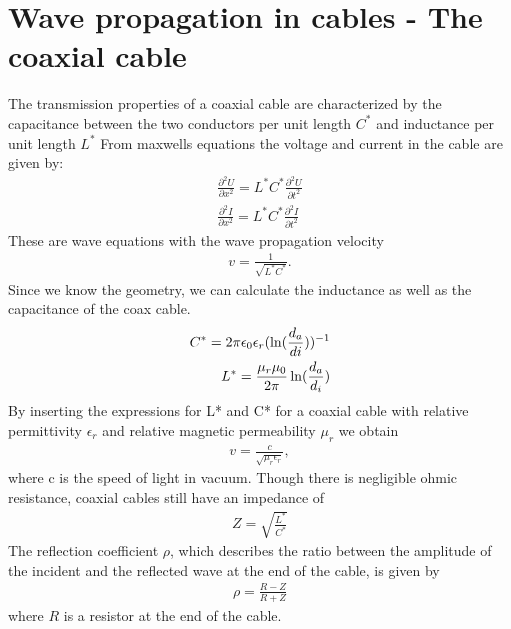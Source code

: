 \documentclass[a4paper,10pt,twocolumn]{article}
\begin{document}
    \section{Wave propagation in cables - The coaxial cable}
    The transmission properties of a coaxial cable are characterized by the capacitance between the two conductors per unit length $C^*$ and inductance per unit length $L^*$
    From maxwells equations the voltage and current in the cable are given by:
    \begin{align*}
        \frac{\partial^2U}{\partial x^2}=L^*C^*\frac{\partial^2U}{\partial t^2}\\
        \frac{\partial^2I}{\partial x^2}=L^*C^*\frac{\partial^2I}{\partial t^2}
    \end{align*}
    These are wave equations with the wave propagation velocity
    \begin{align}
        \label{coaxial:vel}
        v = \frac{1}{\sqrt{L^*C^*}}.
    \end{align}
    Since we know the geometry, we can calculate the inductance as well as the capacitance of the coax cable.
    \begin{align}
        C^* = 2\pi\epsilon_0\epsilon_r (\ln(\frac{d_a}{di}))^{-1}\endline
        L^* = \frac{\mu_r\mu_0}{2\pi}\ln(\frac{d_a}{d_i})
        \end{align}
    By inserting the expressions for L* and C* for a coaxial cable with relative permittivity $\epsilon_r$ and relative magnetic permeability $\mu_r$ we obtain
    \begin{align}
        \label{eq:vavePropagationVelocity}
        v = \frac{c}{\sqrt{\mu_r\epsilon_r}},
    \end{align}
    where c is the speed of light in vacuum.
    Though there is negligible ohmic resistance, coaxial cables still have an impedance of
    \begin{align}
        Z=\sqrt{\frac{L^*}{C^*}}
    \end{align}
    The reflection coefficient $\rho$, which describes the ratio between the amplitude of the incident and the reflected wave at the end of the cable, is given by
    \begin{align}
        \label{eq:coaxRef}
        \rho=\frac{R-Z}{R+Z}
    \end{align}
    where $R$ is a resistor at the end of the cable.
\end{document}
